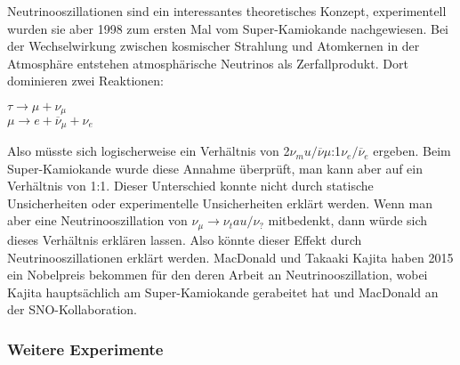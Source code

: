 Neutrinooszillationen sind ein interessantes theoretisches Konzept, experimentell wurden sie 
aber 1998 zum ersten Mal vom Super-Kamiokande nachgewiesen. 
Bei der Wechselwirkung zwischen kosmischer Strahlung und Atomkernen in der Atmosphäre 
entstehen atmosphärische Neutrinos als Zerfallprodukt. Dort dominieren zwei Reaktionen:
\begin {center}
$\tau \rightarrow \mu + \nu_\mu$\\
$\mu \rightarrow e + \overline{\nu}_\mu + \nu_e$
\end {center}
Also müsste sich logischerweise ein Verhältnis von 2$\nu_mu/\overline{\nu}\mu$:1$\nu_e/\overline{\nu}_e$ 
ergeben. Beim Super-Kamiokande wurde diese Annahme überprüft, man kann aber auf ein Verhältnis 
von 1:1. Dieser Unterschied konnte nicht durch statische Unsicherheiten oder experimentelle 
Unsicherheiten erklärt werden. Wenn man aber eine Neutrinooszillation von 
$\nu_\mu \rightarrow \nu_tau/\nu_?$ mitbedenkt, dann würde sich dieses Verhältnis erklären lassen. 
Also könnte dieser Effekt durch Neutrinooszillationen erklärt werden. \cite{FUKUDA2003} MacDonald und Takaaki 
Kajita haben 2015 ein Nobelpreis bekommen für den deren Arbeit an Neutrinooszillation, wobei
Kajita hauptsächlich am Super-Kamiokande gerabeitet hat und MacDonald an der SNO-Kollaboration.

\subsubsection{Weitere Experimente}

